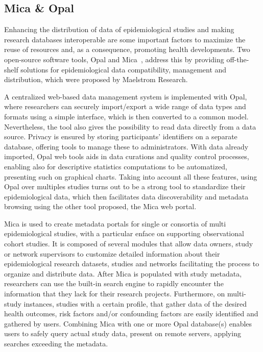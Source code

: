 \subsection*{Mica \& Opal}
Enhancing the distribution of data of epidemiological studies and making research databases interoperable are some important factors to maximize the reuse of resources and, as a consequence, promoting health developments.
Two open-source software tools, Opal and Mica~\cite{mica}, address this by providing off-the-shelf solutions for epidemiological data compatibility, management and distribution, which were proposed by Maelstrom Research.

A centralized web-based data management system is implemented with Opal, where researchers can securely import/export a wide range of data types and formats using a simple interface, which is then converted to a common model.
Nevertheless, the tool also gives the possibility to read data directly from a data source.
Privacy is ensured by storing participants' identifiers on a separate database, offering tools to manage these to administrators.
With data already imported, Opal web tools aids in data curations and quality control processes, enabling also for descriptive statistics computations to be automatized, presenting such on graphical charts.
Taking into account all these features, using Opal over multiples studies turns out to be a strong tool to standardize their epidemiological data, which then facilitates data discoverability and metadata browsing using the other tool proposed, the Mica web portal.

Mica is used to create metadata portals for single or consortia of multi epidemiological studies, with a particular enface on supporting observational cohort studies.
It is composed of several modules that allow data owners, study or network supervisors to customize detailed information about their epidemiological research datasets, studies and networks facilitating the process to organize and distribute data.
After Mica is populated with study metadata, researchers can use the built-in search engine to rapidly encounter the information that they lack for their research projects.
Furthermore, on multi-study instances, studies with a certain profile, that gather data of the desired health outcomes, risk factors and/or confounding factors are easily identified and gathered by users.
Combining Mica with one or more Opal database(s) enables users to safely query actual study data, present on remote servers, applying searches exceeding the metadata.

